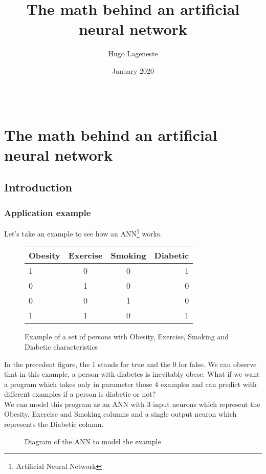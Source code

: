 \documentclass[]{report}
\title{The math behind an artificial neural network}
\author{Hugo Lageneste}
\date{January 2020}
\begin{document}
\begingroup
\let\cleardoublepage\relax
\let\clearpage\relax

\tableofcontents

\needspace{6cm}
\[\;\]

\vfill

\endgroup

\chapter*{The math behind an artificial neural network}

\setcounter{section}{-1}
\section{Introduction}

\subsection{Application example}

{Let's take an example to see how an ANN\footnote{Artificial Neural Network} works.}

\begin{figure}[H]
    \centering
    \begin{tabular}{|l|c|c|r|}
      \hline
      Obesity & Exercise & Smoking & Diabetic \\
      \hline
      1 & 0 & 0 & 1 \\
      0 & 1 & 0 & 0 \\
      0 & 0 & 1 & 0 \\
      1 & 1 & 0 & 1 \\
      \hline
    \end{tabular}
    \caption{Example of a set of persons with Obesity, Exercise, Smoking and Diabetic characteristics}
\end{figure}

{In the precedent figure, the 1 stands for true and the 0 for false. We can observe that in this example, a person with diabetes is inevitably obese. What if we want a program which takes only in parameter those 4 examples and can predict with different examples if a person is diabetic or not?}\\

{We can model this program as an ANN with 3 input neurons which represent the Obesity, Exercise and Smoking columns and a single output neuron which represents
the Diabetic column.}

\begin{figure}[H]
    \centering
    \begin{neuralnetwork}[height=3, nodespacing=15mm]
        \outputlayer[count=1, title=Output layer]
        \linklayers
    \end{neuralnetwork}
    \caption{Diagram of the ANN to model the example}
\end{figure}
\end{document}

